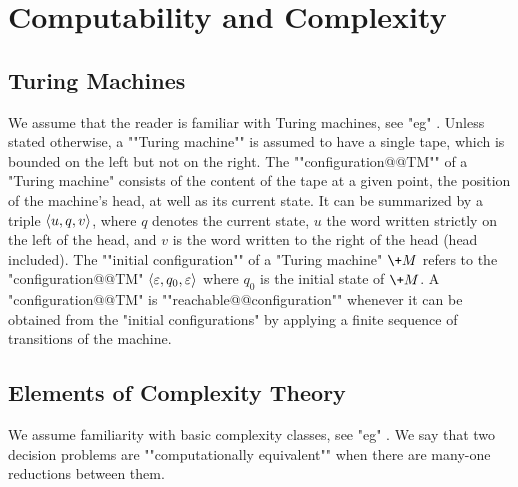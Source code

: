 
\section{Computability and Complexity}

\subsection{Turing Machines}

We assume that the reader is familiar with Turing machines,
see "eg" \cite[\S~1]{AroraBarak2009ComputationalComplexity}.
Unless stated otherwise, a \AP""Turing machine"" is assumed to have a single tape,
which is bounded on the left but not on the right.
The ""configuration@@TM"" of a "Turing machine" consists of
the content of the tape at a given point, the position of the machine's head,
at well as its current state. It can be summarized by
a triple $\langle u, q, v\rangle$, where $q$ denotes the current state,
$u$ the word written strictly on the left of the head,
and $v$ is the word written to the right of the head (head included).
The \AP""initial configuration"" of a "Turing machine" $\+M$ refers to the "configuration@@TM" 
$\langle\varepsilon, q_0, \varepsilon\rangle$ where $q_0$ is the initial state of $\+M$.
A "configuration@@TM" is \AP""reachable@@configuration"" whenever
it can be obtained from the "initial configurations" by applying a finite sequence
of transitions of the machine.

\subsection{Elements of Complexity Theory}

We assume familiarity with basic complexity classes, see "eg"
\cite[\S\!\S~2--5]{AroraBarak2009ComputationalComplexity}.
We say that two decision problems are \AP""computationally equivalent""
when there are many-one reductions between them.


